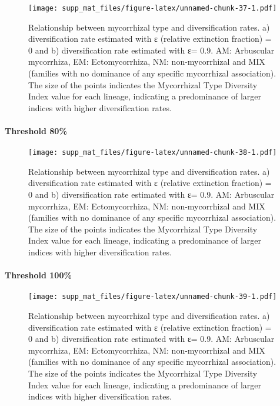\documentclass[]{article}
\let\oldparagraph\paragraph
\renewcommand{\paragraph}[1]{\oldparagraph{#1}\mbox{}}
\begin{document}
\begin{figure}
\centering
\texttt{[image: supp\_mat\_files/figure-latex/unnamed-chunk-37-1.pdf]}
\caption{Relationship between mycorrhizal type and diversification
rates. a) diversification rate estimated with ε (relative extinction
fraction) = 0 and b) diversification rate estimated with ε= 0.9. AM:
Arbuscular mycorrhiza, EM: Ectomycorrhiza, NM: non-mycorrhizal and MIX
(families with no dominance of any specific mycorrhizal association).
The size of the points indicates the Mycorrhizal Type Diversity Index
value for each lineage, indicating a predominance of larger indices with
higher diversification rates.}
\end{figure}

\hypertarget{threshold-80-3}{%
\paragraph{Threshold 80\%}\label{threshold-80-3}}

\begin{figure}
\centering
\texttt{[image: supp\_mat\_files/figure-latex/unnamed-chunk-38-1.pdf]}
\caption{Relationship between mycorrhizal type and diversification
rates. a) diversification rate estimated with ε (relative extinction
fraction) = 0 and b) diversification rate estimated with ε= 0.9. AM:
Arbuscular mycorrhiza, EM: Ectomycorrhiza, NM: non-mycorrhizal and MIX
(families with no dominance of any specific mycorrhizal association).
The size of the points indicates the Mycorrhizal Type Diversity Index
value for each lineage, indicating a predominance of larger indices with
higher diversification rates.}
\end{figure}

\hypertarget{threshold-100-3}{%
\paragraph{Threshold 100\%}\label{threshold-100-3}}

\begin{figure}
\centering
\texttt{[image: supp\_mat\_files/figure-latex/unnamed-chunk-39-1.pdf]}
\caption{Relationship between mycorrhizal type and diversification
rates. a) diversification rate estimated with ε (relative extinction
fraction) = 0 and b) diversification rate estimated with ε= 0.9. AM:
Arbuscular mycorrhiza, EM: Ectomycorrhiza, NM: non-mycorrhizal and MIX
(families with no dominance of any specific mycorrhizal association).
The size of the points indicates the Mycorrhizal Type Diversity Index
value for each lineage, indicating a predominance of larger indices with
higher diversification rates.}
\end{figure}
\end{document}
